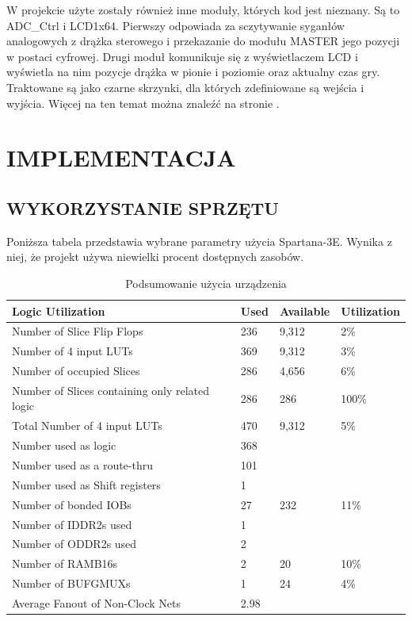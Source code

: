 \documentclass[11pt]{article}
\begin{document}
W projekcie użyte zostały również inne moduły, których kod jest nieznany.
Są to ADC\_Ctrl i LCD1x64.
Pierwszy odpowiada za sczytywanie syganłów analogowych z drążka sterowego i przekazanie do modułu MASTER jego pozycji w postaci cyfrowej.
Drugi moduł komunikuje się z wyświetlaczem LCD i wyświetla na nim pozycje drążka w pionie i poziomie oraz aktualny czas gry.
Traktowane są jako czarne skrzynki, dla których zdefiniowane są wejścia i wyjścia.
Więcej na ten temat można znaleźć na stronie \cite{pb}.


\section{IMPLEMENTACJA}

\subsection{WYKORZYSTANIE SPRZĘTU}

Poniższa tabela przedstawia wybrane parametry użycia Spartana-3E.
Wynika z niej, że projekt używa niewielki procent dostępnych zasobów.

\begin{table}[H]
\caption{Podsumowanie użycia urządzenia}
\begin{tabular}{|l|l|l|l|}
\hline
Logic Utilization &
Used &
Available &
Utilization \\
\hline
Number of Slice Flip Flops &
236 &
9,312 &
2\% \\
\hline
Number of 4 input LUTs &
369 &
9,312 &
3\% \\
\hline
Number of occupied Slices &
286 &
4,656 & 
6\% \\
\hline
Number of Slices containing only related logic &
286 &
286 &
100\% \\
\hline

Total Number of 4 input LUTs &
470 &
9,312 &
5\% \\
\hline
Number used as logic &
368 & & \\
\hline
 
Number used as a route-thru &
101 & & \\
\hline
 
Number used as Shift registers &
1 & & \\
\hline
 
Number of bonded IOBs &
27 &
232 &
11\% \\
\hline
Number of IDDR2s used &
1 & & \\
\hline 
 
Number of ODDR2s used &
2 & & \\
\hline
 
 
Number of RAMB16s &
2 &
20 &
10\% \\
\hline
Number of BUFGMUXs &
1 &
24 &
4\% \\
\hline
Average Fanout of Non-Clock Nets &
2.98 & & \\
\hline
\end{tabular}

\end{table}
\end{document}
